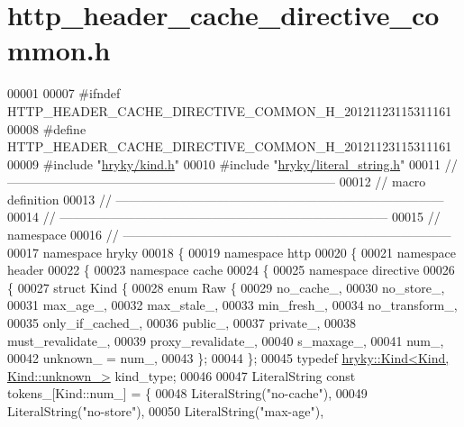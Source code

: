 \hypertarget{http__header__cache__directive__common_8h_source}{\section{http\-\_\-header\-\_\-cache\-\_\-directive\-\_\-common.\-h}
}

\begin{DoxyCode}
00001 
00007 \textcolor{preprocessor}{#ifndef HTTP\_HEADER\_CACHE\_DIRECTIVE\_COMMON\_H\_20121123115311161}
00008 \textcolor{preprocessor}{}\textcolor{preprocessor}{#define HTTP\_HEADER\_CACHE\_DIRECTIVE\_COMMON\_H\_20121123115311161}
00009 \textcolor{preprocessor}{}\textcolor{preprocessor}{#include "\hyperlink{kind_8h}{hryky/kind.h}"}
00010 \textcolor{preprocessor}{#include "\hyperlink{literal__string_8h}{hryky/literal_string.h}"}
00011 \textcolor{comment}{//
      ------------------------------------------------------------------------------}
00012 \textcolor{comment}{// macro definition}
00013 \textcolor{comment}{//
      ------------------------------------------------------------------------------}
00014 \textcolor{comment}{//
      ------------------------------------------------------------------------------}
00015 \textcolor{comment}{// namespace}
00016 \textcolor{comment}{//
      ------------------------------------------------------------------------------}
00017 \textcolor{keyword}{namespace }hryky
00018 \{
00019 \textcolor{keyword}{namespace }http
00020 \{
00021 \textcolor{keyword}{namespace }header
00022 \{
00023 \textcolor{keyword}{namespace }cache
00024 \{
00025 \textcolor{keyword}{namespace }directive
00026 \{
00027     \textcolor{keyword}{struct }Kind \{
00028         \textcolor{keyword}{enum} Raw \{
00029             no\_cache\_,
00030             no\_store\_,
00031             max\_age\_,
00032             max\_stale\_,
00033             min\_fresh\_,
00034             no\_transform\_,
00035             only\_if\_cached\_,
00036             public\_,
00037             private\_,
00038             must\_revalidate\_,
00039             proxy\_revalidate\_,
00040             s\_maxage\_,
00041             num\_,
00042             unknown\_ = num\_,
00043         \};
00044     \};
00045     \textcolor{keyword}{typedef} \hyperlink{classhryky_1_1_kind}{hryky::Kind<Kind, Kind::unknown_>} kind\_type;
00046 
00047     LiteralString \textcolor{keyword}{const} tokens\_[Kind::num\_] = \{
00048         LiteralString(\textcolor{stringliteral}{"no-cache"}),
00049         LiteralString(\textcolor{stringliteral}{"no-store"}),
00050         LiteralString(\textcolor{stringliteral}{"max-age"}),

\end{DoxyCode}
